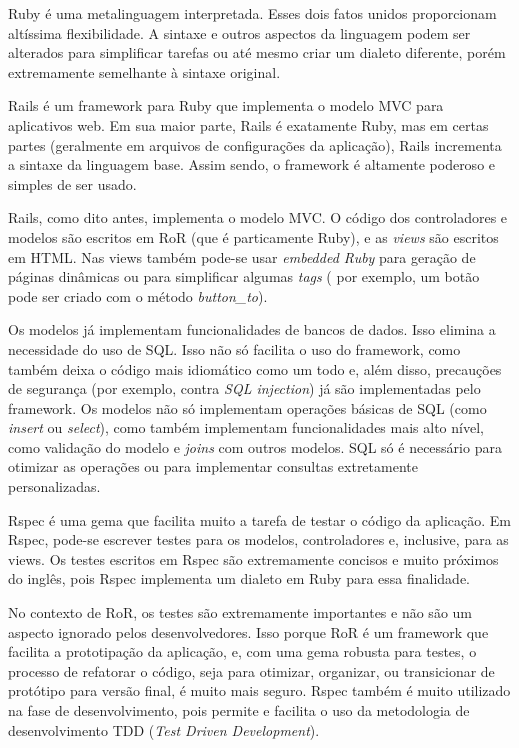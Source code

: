 
Ruby é uma metalinguagem interpretada. Esses dois fatos unidos proporcionam altíssima flexibilidade.
A sintaxe e outros aspectos da linguagem podem ser alterados para simplificar tarefas ou até mesmo criar um dialeto diferente, porém extremamente
semelhante à sintaxe original. 

Rails é um framework para Ruby que implementa o modelo MVC para aplicativos web. Em sua maior parte, Rails é exatamente Ruby, mas
em certas partes (geralmente em arquivos de configurações da aplicação), Rails incrementa a sintaxe da linguagem base. Assim sendo, 
o framework é altamente poderoso e simples de ser usado.

Rails, como dito antes, implementa o modelo MVC. O código dos controladores e modelos são escritos em RoR (que é particamente Ruby), e as \textit{views}
são escritos em HTML. Nas views também pode-se usar \textit{embedded Ruby} para geração de páginas dinâmicas ou para simplificar algumas \textit{tags} (
por exemplo, um botão pode ser criado com o método \textit{button_to}).

Os modelos já implementam funcionalidades de bancos de dados. Isso elimina a necessidade do uso de SQL. Isso não só facilita o uso do framework,
como também deixa o código mais idiomático como um todo e, além disso, precauções de segurança (por exemplo, contra \textit{SQL injection}) já
são implementadas pelo framework. Os modelos não só implementam operações básicas de SQL (como \textit{insert} ou \textit{select}), como também implementam
funcionalidades mais alto nível, como validação do modelo e \textit{joins} com outros modelos. SQL só é necessário para otimizar as operações ou para
implementar consultas extretamente personalizadas.

Rspec é uma gema que facilita muito a tarefa de testar o código da aplicação. Em Rspec, pode-se escrever testes para os modelos, controladores e, inclusive,
para as views. Os testes escritos em Rspec são extremamente concisos e muito próximos do inglês, pois Rspec implementa um dialeto em Ruby para essa finalidade.

No contexto de RoR, os testes são extremamente importantes e não são um aspecto ignorado pelos desenvolvedores. Isso porque RoR é um framework
que facilita a prototipação da aplicação, e, com uma gema robusta para testes, o processo de refatorar o código, seja para otimizar, organizar, ou 
transicionar de protótipo para versão final, é muito mais seguro. Rspec também é muito utilizado na fase de desenvolvimento, pois permite e facilita o
uso da metodologia de desenvolvimento TDD (\textit{Test Driven Development}).

